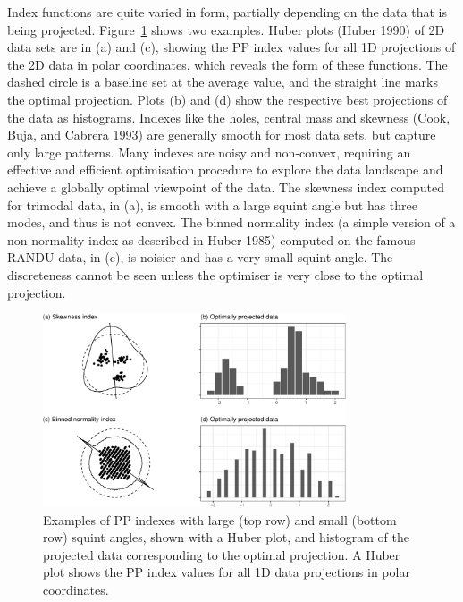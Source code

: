 \documentclass[
  12pt,
]{interact}
\theoremstyle{plain}
\begin{document}
Index functions are quite varied in form, partially depending on the
data that is being projected. Figure~\ref{fig-example-functions} shows
two examples. Huber plots (Huber 1990) of 2D data sets are in (a) and
(c), showing the PP index values for all 1D projections of the 2D data
in polar coordinates, which reveals the form of these functions. The
dashed circle is a baseline set at the average value, and the straight
line marks the optimal projection. Plots (b) and (d) show the respective
best projections of the data as histograms. Indexes like the holes,
central mass and skewness (Cook, Buja, and Cabrera 1993) are generally
smooth for most data sets, but capture only large patterns. Many indexes
are noisy and non-convex, requiring an effective and efficient
optimisation procedure to explore the data landscape and achieve a
globally optimal viewpoint of the data. The skewness index computed for
trimodal data, in (a), is smooth with a large squint angle but has three
modes, and thus is not convex. The binned normality index (a simple
version of a non-normality index as described in Huber 1985) computed on
the famous RANDU data, in (c), is noisier and has a very small squint
angle. The discreteness cannot be seen unless the optimiser is very
close to the optimal projection.

\begin{figure}

{\centering \includegraphics[width=0.8\textwidth,height=\textheight]{jso_files/figure-pdf/fig-example-functions-1.pdf}

}

\caption{\label{fig-example-functions}Examples of PP indexes with large
(top row) and small (bottom row) squint angles, shown with a Huber plot,
and histogram of the projected data corresponding to the optimal
projection. A Huber plot shows the PP index values for all 1D data
projections in polar coordinates.}

\end{figure}
\end{document}
